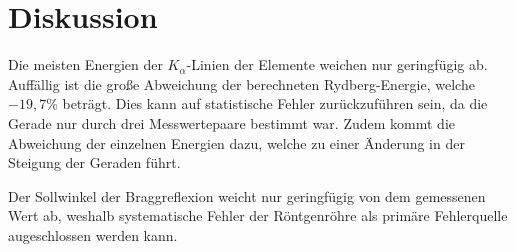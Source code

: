 \section{Diskussion}
\label{sec:Diskussion}
Die meisten Energien der $K_{\alpha}$-Linien der Elemente weichen nur geringfügig ab.
Auffällig ist die große Abweichung der berechneten Rydberg-Energie, welche $-19,7\%$ beträgt. Dies kann auf statistische
Fehler zurückzuführen sein, da die Gerade nur durch drei Messwertepaare bestimmt war. Zudem kommt die Abweichung der einzelnen
Energien dazu, welche zu einer Änderung in der Steigung der Geraden führt.

Der Sollwinkel der Braggreflexion weicht nur geringfügig von dem gemessenen Wert ab, weshalb systematische Fehler der
Röntgenröhre als primäre Fehlerquelle augeschlossen werden kann.

